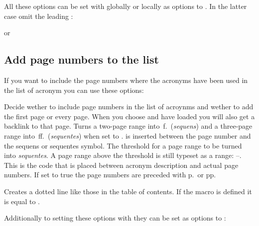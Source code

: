 \documentclass{acro-manual}
\newcommand*\latin[1]{\textit{#1}}
\begin{document}
All these options can be set with  globally or locally as options
to . In the latter case omit the leading
:
\begin{sourcecode}
  or
  \printacronyms[display=all,exclude=units]
\end{sourcecode}

\subsection{Add page numbers to the list}\label{sec:page-numbers}
If you want to include the page numbers where the acronyms have been used in
the list of acronym you can use these options:
\begin{options}
    Decide wether to include page numbers in the list of acroynms and wether
    to add the first page or every page.  When you choose  and
    have  loaded you will also get a backlink to that page.
    Turns a two-page range into \,f.\ (\latin{sequens}) and a
    three-page range into \,ff.\ (\latin{sequentes}) when set to
    .
  \Default{\cs*{,}}
     is inserted between the page number and the sequens or
    sequentes symbol.
    The threshold for a page range to be turned into \latin{sequentes}.  A
    page range above the threshold is still typeset as a range:
    --.
    This is the code that is placed between acronym description and actual
    page numbers.
    If set to true the page numbers are preceded with p.\ or pp.
\end{options}
\begin{commands}
    Creates a dotted line like those in the table of
    contents.  If the macro  is defined it is equal to
    .
\end{commands}
Additionally to setting these options with  they
can be set as options to :
\begin{sourcecode}
  \printacronyms[pages={display=all,seq/use=false}]
\end{sourcecode}
\end{document}
